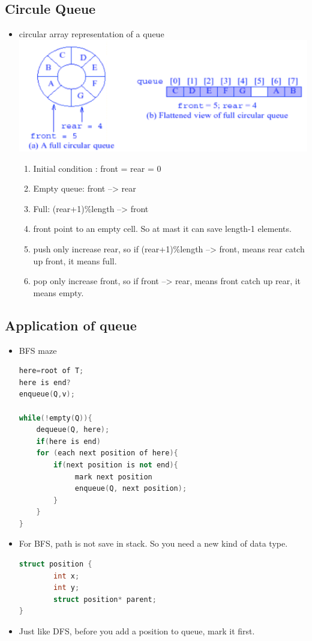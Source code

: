 \documentclass[a4paper,12pt,twoside]{book}
\begin{document}
\subsection{Circule Queue}
\begin{itemize}
\item circular array representation of a queue
\includegraphics[scale=0.35]{pics/cd.png} \newline
\begin{enumerate}
\item Initial condition : front = rear = 0
\item Empty queue:     front --> rear
\item Full: (rear+1)\%length --> front
\item front point to an empty cell. So at mast it can save length-1 elements. 
\item push only increase rear, so if (rear+1)\%length --> front, means rear catch up front, it means full. 
\item pop only increase front, so if front --> rear, means front catch up rear, it means empty.
\end{enumerate}
\end{itemize}


\subsection{Application of queue}
\begin{itemize}
\item  BFS maze 
\begin{lstlisting}[frame=single, language=c++]
here=root of T;
here is end?
enqueue(Q,v);

while(!empty(Q)){
    dequeue(Q, here);
    if(here is end)
    for (each next position of here){
        if(next position is not end){
             mark next position
             enqueue(Q, next position);
        }
    }
}
\end{lstlisting}

\item For BFS, path is not save in stack. So you need a new kind of data type. 
\begin{lstlisting}[frame=single, language=c++]
struct position {
        int x;
        int y;
        struct position* parent;
}
\end{lstlisting}
\item Just like DFS, before you add a position to queue, mark it first. 

\end{itemize}
\end{document}
